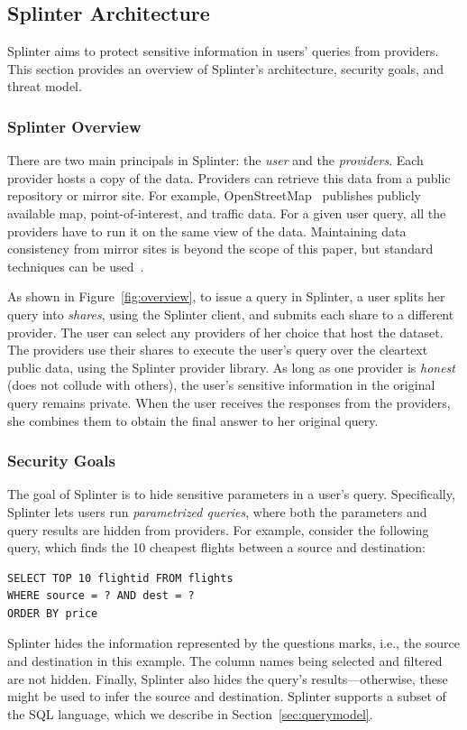 \subsection{Splinter Architecture}
\label{sec:goals}

Splinter aims to protect sensitive information in users' queries
from providers. This section provides an overview of Splinter's architecture,
security goals, and threat model.

\subsubsection{Splinter Overview}
\label{sec:model}
There are two main principals in Splinter: the \emph{user} and the \emph{providers}.
Each provider hosts a copy of the data. Providers can 
retrieve this data from a public repository or mirror site.
For example, OpenStreetMap~\cite{osm} publishes publicly available 
map, point-of-interest, and traffic data. 
For a given user query, all the providers have to run it on the same
view of the data. Maintaining data consistency
from mirror sites is beyond the scope of this paper, but
standard techniques can be used~\cite{tewari2002wcdp,chi2008novel}.

As shown in Figure~\ref{fig:overview}, 
to issue a query in Splinter, a user
splits her query into \textit{shares}, using the Splinter client,
and submits each share to a different provider.
The user can select any providers of her choice that host the dataset.
The providers use their shares to execute the user's query 
over the cleartext public data, using the Splinter provider library. 
As long as one provider is \textit{honest}
(does not collude with others), the user's sensitive information in the original query
remains private. When the user receives the responses from the providers,
she combines them to obtain the final answer to her original query. 

\subsubsection{Security Goals}
\label{sec:query_model}
The goal of Splinter is to hide sensitive parameters in
a user's query.
Specifically, Splinter lets users run \emph{parametrized queries}, 
where both the parameters and query results are hidden from providers.
For example, consider the following query, which finds the 10 cheapest flights between a source and destination:
\begin{verbatim}
SELECT TOP 10 flightid FROM flights
WHERE source = ? AND dest = ? 
ORDER BY price
\end{verbatim}
Splinter hides the information represented by the questions marks, i.e.,
the source and destination in this example.
The column names being selected and filtered are not hidden.
Finally, Splinter also hides the query's results---otherwise,
these might be used to infer the source and destination. 
Splinter supports a subset of the SQL language, which we describe in Section~\ref{sec:querymodel}.

